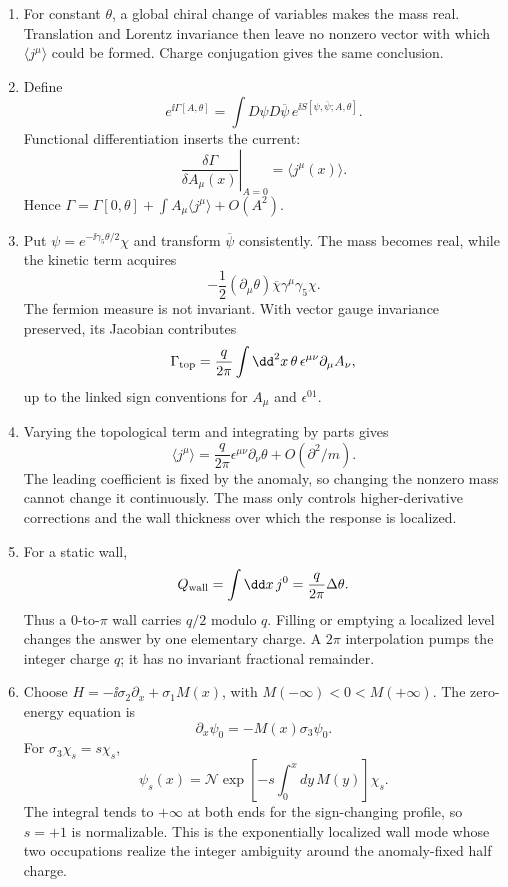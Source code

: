 \begin{enumerate}
  \begin{enumerate}
    \item[(a)] For constant \(\theta\), a global chiral change of variables
      makes the mass real.  Translation and Lorentz invariance then leave
      no nonzero vector with which \(\langle j^\mu\rangle\) could be
      formed.  Charge conjugation gives the same conclusion.
    \item[(b)] Define
      \[
        e^{\ii\Gamma[A,\theta]}
          =\int D\psi D\overline\psi\,
            e^{\ii S[\psi,\overline\psi;A,\theta]} .
      \]
      Functional differentiation inserts the current:
      \[
        \left.\frac{\delta\Gamma}{\delta A_\mu(x)}\right|_{A=0}
          =\langle j^\mu(x)\rangle .
      \]
      Hence
      \(\Gamma=\Gamma[0,\theta]+\int A_\mu\langle j^\mu\rangle
      +O(A^2)\).
    \item[(c)] Put
      \(\psi=e^{-\ii\gamma_5\theta/2}\chi\) and transform
      \(\overline\psi\) consistently.  The mass becomes real, while the
      kinetic term acquires
      \[
        -\frac12(\partial_\mu\theta)
          \overline\chi\gamma^\mu\gamma_5\chi .
      \]
      The fermion measure is not invariant.  With vector gauge invariance
      preserved, its Jacobian contributes
      \[
        \Gamma_{\rm top}
          =\frac{q}{2\pi}\int \dd^2x\,
            \theta\,\epsilon^{\mu\nu}\partial_\mu A_\nu ,
      \]
      up to the linked sign conventions for \(A_\mu\) and
      \(\epsilon^{01}\).
    \item[(d)] Varying the topological term and integrating by parts gives
      \[
        \boxed{\langle j^\mu\rangle
          =\frac{q}{2\pi}
             \epsilon^{\mu\nu}\partial_\nu\theta+O(\partial^2/m).}
      \]
      The leading coefficient is fixed by the anomaly, so changing the
      nonzero mass cannot change it continuously.  The mass only controls
      higher-derivative corrections and the wall thickness over which the
      response is localized.
    \item[(e)] For a static wall,
      \[
        Q_{\rm wall}=\int \dd x\,j^0
          =\frac{q}{2\pi}\Delta\theta .
      \]
      Thus a \(0\)-to-\(\pi\) wall carries \(q/2\) modulo \(q\).  Filling or
      emptying a localized level changes the answer by one elementary
      charge.  A \(2\pi\) interpolation pumps the integer charge \(q\);
      it has no invariant fractional remainder.
    \item[(f)] Choose
      \(H=-\ii\sigma_2\partial_x+\sigma_1M(x)\), with
      \(M(-\infty)<0<M(+\infty)\).  The zero-energy equation is
      \[
        \partial_x\psi_0=-M(x)\sigma_3\psi_0 .
      \]
      For \(\sigma_3\chi_s=s\chi_s\),
      \[
        \psi_s(x)=\mathcal N
          \exp\left[-s\int_0^xdy\,M(y)\right]\chi_s .
      \]
      The integral tends to \(+\infty\) at both ends for the sign-changing
      profile, so \(s=+1\) is normalizable.  This is the exponentially
      localized wall mode whose two occupations realize the integer
      ambiguity around the anomaly-fixed half charge.
  \end{enumerate}


\end{enumerate}
